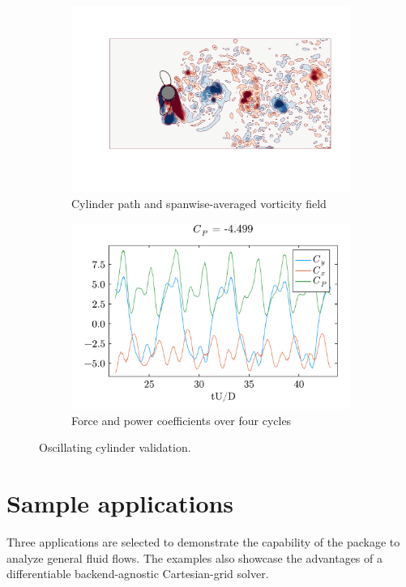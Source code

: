 \documentclass[10pt,a4paper]{article}
\begin{document}
\begin{figure}[!t]
    \begin{subfigure}{0.48\linewidth}
      \center
        \includegraphics[width=\linewidth,trim={50 30 20 30},clip]{tex/img/OscCyl_flow.pdf}
        \caption{Cylinder path and spanwise-averaged vorticity field}
    \end{subfigure}
    \begin{subfigure}{0.48\linewidth}
        \centering
        \includegraphics[width=\linewidth]{tex/img/OscCyl_hist.pdf}
        \caption{Force and power coefficients over four cycles}
    \end{subfigure}
  \caption{Oscillating cylinder validation.}
  \label{fig:cyl_val}
\end{figure}

\section{Sample applications}\label{sec:applications}
Three applications are selected to demonstrate the capability of the package to analyze general fluid flows. The examples also showcase the advantages of a differentiable backend-agnostic Cartesian-grid solver.
\end{document}
